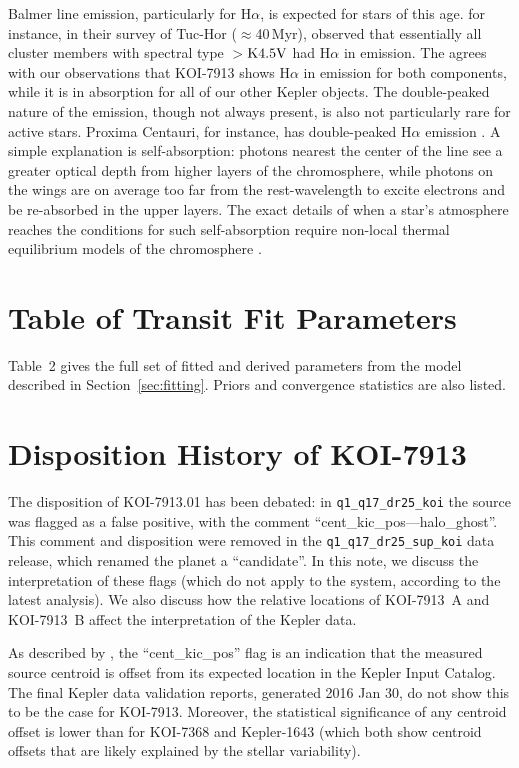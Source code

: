 \documentclass[12pt,twocolumn]{aastex63}
\begin{document}
Balmer line emission, particularly for H$\alpha$, is expected for
stars of this age.  \citet{kraus_stellar_2014} for instance, in their
survey of Tuc-Hor ($\approx$40\,Myr), observed that essentially all
cluster members with spectral type $>$${\rm K4.5V}$ had H$\alpha$ in
emission.  The agrees with our observations that KOI-7913 shows
H$\alpha$ in emission for both components, while it is in absorption
for all of our other Kepler objects.  The double-peaked nature of the
emission, though not always present, is also not particularly rare for
active stars.  Proxima Centauri, for instance, has double-peaked
H$\alpha$ emission \citep{collins_calculations_2017}.  A simple
explanation is self-absorption: photons nearest the center of the line
see a greater optical depth from higher layers of the chromosphere,
while photons on the wings are on average too far from the
rest-wavelength to excite electrons and be re-absorbed in the upper
layers.  The exact details of when a star's atmosphere reaches the
conditions for such self-absorption require non-local thermal
equilibrium models of the chromosphere
\citep{short_chromospheric_1998,2005A&A...439.1137F}.


\section{Table of Transit Fit Parameters}
\label{app:transit}

Table~2 gives the full set of fitted and derived
parameters from the model described in Section~\ref{sec:fitting}.
Priors and convergence statistics are also listed.


\section{Disposition History of KOI-7913}
\label{app:koi7913}

The disposition of KOI-7913.01 has been debated: in
\texttt{q1\_q17\_dr25\_koi} the source was flagged as a false
positive, with the comment ``cent\_kic\_pos---halo\_ghost''.  This
comment and disposition were removed in the
\texttt{q1\_q17\_dr25\_sup\_koi} data release, which renamed the
planet a ``candidate''.  In this note, we discuss the interpretation
of these flags (which do not apply to the system, according to the
latest analysis).  We also discuss how the relative locations of
KOI-7913~A and KOI-7913~B affect the interpretation of the Kepler
data.

As described by \citet{thompson_planetary_2018}, the
``cent\_kic\_pos'' flag is an indication that the measured source
centroid is offset from its expected location in the Kepler Input
Catalog.  The final Kepler data validation reports, generated 2016 Jan
30, do not show this to be the case for KOI-7913.  Moreover, the
statistical significance of any centroid offset is lower than for
KOI-7368 and Kepler-1643 (which both show centroid offsets that are
likely explained by the stellar variability).
\end{document}
